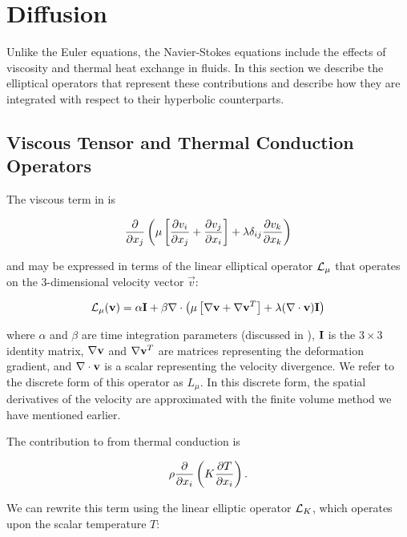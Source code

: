 \section{Diffusion\label{sec:Diffusion}}

Unlike the Euler equations, the Navier-Stokes equations include the effects 
of viscosity and thermal heat exchange in fluids. In this section we describe 
the elliptical operators that represent these contributions and describe how 
they are integrated with respect to their hyperbolic counterparts.

\subsection{Viscous Tensor and Thermal Conduction Operators}
The viscous term in  is 

\begin{equation}
\frac{\partial }{\partial x_j}\left(\mu\left[\frac{\partial v_i}{\partial x_j} + \frac{\partial v_j}{\partial x_i}\right] + \lambda\delta_{ij}\frac{\partial v_k}{\partial x_k}\right)
\end{equation}

\noindent
and may be expressed in terms of the linear elliptical operator $\mathcal{L}_\mu$ that 
operates on the 3-dimensional velocity vector $\vec{v}$:

\begin{equation}
\mathcal{L}_\mu(\mathbf{v}) = \alpha \mathbf{I} + \beta\nabla\cdot{\left(\mu\left[\nabla{\mathbf{v}} + 
                   \nabla{\mathbf{v}}^T\right] + \lambda (\nabla\cdot{\mathbf{v}})\mathbf{I}\right)} \label{eq:Lmu}
\end{equation}

\noindent
where $\alpha$ and $\beta$ are time integration parameters (discussed in 
), $\mathbf{I}$ is the $3\times 3$ identity matrix, $\nabla{\mathbf{v}}$ 
and $\nabla{\mathbf{v}}^T$ are matrices representing the deformation gradient, and
$\nabla\cdot{\mathbf{v}}$ is a scalar representing the velocity divergence.  We refer 
to the discrete form of this operator as $L_\mu$. In this discrete form, the 
spatial derivatives of the velocity are approximated with the finite volume 
method we have mentioned earlier.

The contribution to  from thermal conduction is

\begin{equation}
\rho\frac{\partial }{\partial x_i}\left(K\frac{\partial T}{\partial x_i}\right).
\end{equation}

\noindent
We can rewrite this term using the linear elliptic operator $\mathcal{L}_K$, which 
operates upon the scalar temperature $T$:

